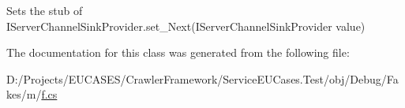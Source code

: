 Sets the stub of I\-Server\-Channel\-Sink\-Provider.\-set\-\_\-\-Next(\-I\-Server\-Channel\-Sink\-Provider value)



The documentation for this class was generated from the following file\-:\begin{DoxyCompactItemize}
\item 
D\-:/\-Projects/\-E\-U\-C\-A\-S\-E\-S/\-Crawler\-Framework/\-Service\-E\-U\-Cases.\-Test/obj/\-Debug/\-Fakes/m/\hyperlink{m_2f_8cs}{f.\-cs}\end{DoxyCompactItemize}
